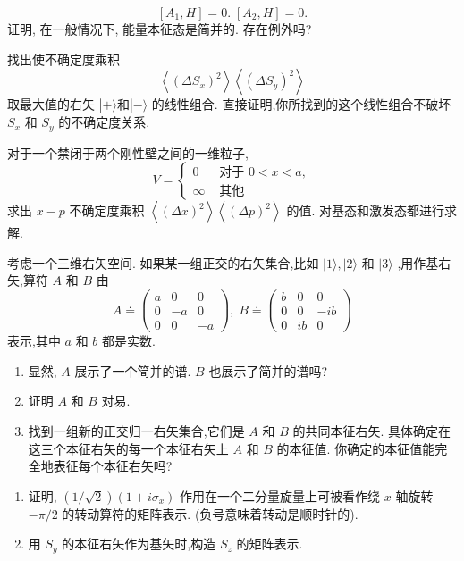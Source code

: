 \documentclass[lang=cn,newtx,10pt,scheme=chinese,thmcnt=section]{elegantbook}
\begin{document}
\begin{problemset}
	$$
	\left\lbrack {{A}_{1}, H}\right\rbrack = 0.\;\left\lbrack {{A}_{2}, H}\right\rbrack = 0.
	$$
	证明, 在一般情况下, 能量本征态是简并的. 存在例外吗? 
	\item 找出使不确定度乘积
	$$
	\left\langle {\left( \Delta {S}_{x}\right) }^{2}\right\rangle \left\langle {\left( \Delta {S}_{y}\right) }^{2}\right\rangle 
	$$
	取最大值的右矢 $\left| {+\rangle \text{和}}\right| - \rangle$ 的线性组合. 直接证明,你所找到的这个线性组合不破坏 ${S}_{x}$ 和 ${S}_{y}$ 的不确定度关系.
	\item 对于一个禁闭于两个刚性壁之间的一维粒子,
	$$
	V = \left\{ \begin{array}{ll} 0 & \text{ 对于 }0 < x < a, \\ \infty & \text{ 其他 } \end{array}\right.
	$$
	求出 $x - p$ 不确定度乘积 $\left\langle {\left( \Delta x\right) }^{2}\right\rangle \left\langle {\left( \Delta p\right) }^{2}\right\rangle$ 的值. 对基态和激发态都进行求解.
	\item 考虑一个三维右矢空间. 如果某一组正交的右矢集合,比如 $\left| {1\rangle ,}\right| 2\rangle$ 和 $|3\rangle$ ,用作基右矢,算符 $A$ 和 $B$ 由
	$$
	A \doteq \left( \begin{matrix} a & 0 & 0 \\ 0 & - a & 0 \\ 0 & 0 & - a \end{matrix}\right) ,\;B \doteq \left( \begin{matrix} b & 0 & 0 \\ 0 & 0 & - {ib} \\ 0 & {ib} & 0 \end{matrix}\right)
	$$
	表示,其中 $a$ 和 $b$ 都是实数.
	\begin{enumerate}
		\item 显然, $A$ 展示了一个简并的谱. $B$ 也展示了简并的谱吗?
		\item 证明 $A$ 和 $B$ 对易.
		\item 找到一组新的正交归一右矢集合,它们是 $A$ 和 $B$ 的共同本征右矢. 具体确定在这三个本征右矢的每一个本征右矢上 $A$ 和 $B$ 的本征值. 你确定的本征值能完全地表征每个本征右矢吗?
	\end{enumerate}
	\item 
	\begin{enumerate}
		\item 证明, $\left( {1/\sqrt{2}}\right) \left( {1 + i{\sigma }_{x}}\right)$ 作用在一个二分量旋量上可被看作绕 $x$ 轴旋转 $- \pi /2$ 的转动算符的矩阵表示. (负号意味着转动是顺时针的).
		\item 用 ${S}_{y}$ 的本征右矢作为基矢时,构造 ${S}_{z}$ 的矩阵表示.

\end{enumerate}
\end{problemset}
\end{document}
